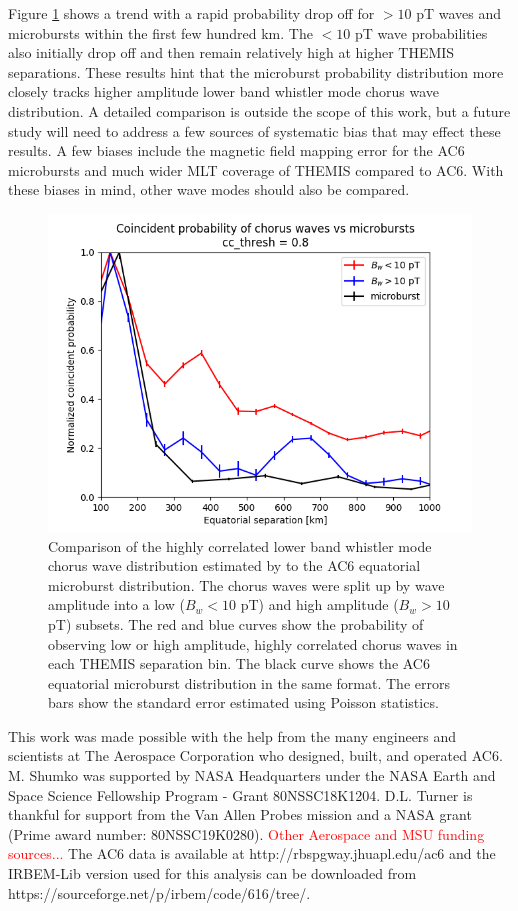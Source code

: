 \documentclass[draft]{agujournal2019}
\begin{document}
Figure \ref{fig_appendixc_1} shows a trend with a rapid probability drop off for $> 10$ pT waves and microbursts within the first few hundred km. The $< 10$ pT wave probabilities also initially drop off and then remain relatively high at higher THEMIS separations. These results hint that the microburst probability distribution more closely tracks higher amplitude lower band whistler mode chorus wave distribution. A detailed comparison is outside the scope of this work, but a future study will need to address a few sources of systematic bias that may effect these results. A few biases include the magnetic field mapping error for the AC6 microbursts and much wider MLT coverage of THEMIS compared to AC6. With these biases in mind, other wave modes should also be compared.

\begin{figure}
\includegraphics[width=\textwidth]{appendixc_compare_chorus_microburst_fraction_cc_thresh_8.png}
\caption{Comparison of the highly correlated lower band whistler mode chorus wave distribution estimated by  to the AC6 equatorial microburst distribution. The chorus waves were split up by wave amplitude into a low ($B_w < 10$ pT) and high amplitude ($B_w > 10$ pT) subsets. The red and blue curves show the probability of observing low or high amplitude, highly correlated chorus waves in each THEMIS separation bin. The black curve shows the AC6 equatorial microburst distribution in the same format. The errors bars show the standard error estimated using Poisson statistics.}
\label{fig_appendixc_1}
\end{figure}


\acknowledgments
This work was made possible with the help from the many engineers and scientists at The Aerospace Corporation who designed, built, and operated AC6. M. Shumko was supported by NASA Headquarters under the NASA Earth and Space Science Fellowship Program - Grant 80NSSC18K1204. D.L. Turner is thankful for support from the Van Allen Probes mission and a NASA grant (Prime award number: 80NSSC19K0280). \textcolor{red}{Other Aerospace and MSU funding sources...} The AC6 data is available at http://rbspgway.jhuapl.edu/ac6 and the IRBEM-Lib version used for this analysis can be downloaded from https://sourceforge.net/p/irbem/code/616/tree/.


\end{document}
